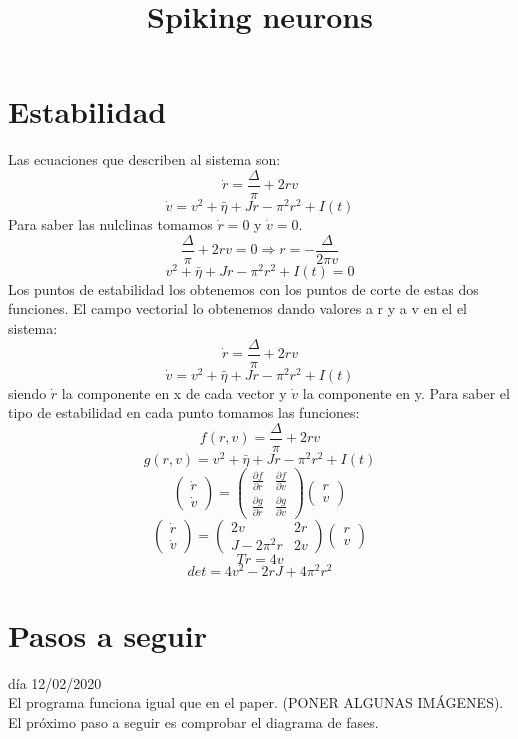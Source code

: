 \documentclass[a4paper]{article}
\title{Spiking neurons}
\begin{document}
\maketitle
\section{Estabilidad}
Las ecuaciones que describen al sistema son:
$$\dot{r}=\frac{\Delta}{\pi}+2rv$$
$$\dot{v}=v^2+\bar{\eta}+Jr-\pi^2 r^2 + I(t)$$
Para saber las nulclinas tomamos $\dot{r}=0$ y $\dot{v} = 0$.
$$\frac{\Delta}{\pi}+2rv=0 \Rightarrow r = -\frac{\Delta}{2 \pi v}$$
$$v^2+\bar{\eta}+Jr-\pi^2 r^2 + I(t) = 0$$
Los puntos de estabilidad los obtenemos con los puntos de corte de estas dos funciones.
El campo vectorial lo obtenemos dando valores a r y a v en el el sistema:
$$\dot{r}=\frac{\Delta}{\pi}+2rv$$
$$\dot{v}=v^2+\bar{\eta}+Jr-\pi^2 r^2 + I(t)$$
siendo $\dot{r}$ la componente en x de cada vector y $\dot{v}$ la componente en y. 
Para saber el tipo de estabilidad en cada punto tomamos las funciones:
$$f(r,v) = \frac{\Delta}{\pi}+2rv$$
$$g(r,v) = v^2+\bar{\eta}+Jr-\pi^2 r^2 + I(t)$$
$$
\begin{pmatrix} \dot{r} \\ \dot{v} \end{pmatrix} = 
\begin{pmatrix}
\frac{\partial f}{\partial r} & \frac{\partial f}{\partial v} \\
\frac{\partial g}{\partial r} & \frac{\partial g}{\partial v}
\end{pmatrix}
\begin{pmatrix} r \\ v \end{pmatrix}
$$
$$
\begin{pmatrix} \dot{r} \\ \dot{v} \end{pmatrix} = 
\begin{pmatrix}
2v & 2r \\
J - 2\pi^2 r & 2v
\end{pmatrix}
\begin{pmatrix} r \\ v \end{pmatrix}
$$
$$Tr = 4v$$
$$det = 4v^2 - 2rJ + 4\pi^2 r^2$$
\section{Pasos a seguir}
día 12/02/2020 \\
El programa funciona igual que en el paper. (PONER ALGUNAS IMÁGENES). El próximo paso a seguir es comprobar el diagrama de fases.\\
\end{document}
